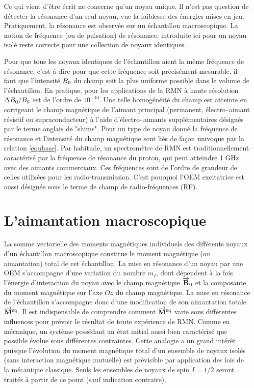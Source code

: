 Ce qui vient d'être écrit ne concerne qu'un noyau unique.
Il n'est pas question de détecter la résonance d'un seul noyau,
vue la faiblesse des énergies mises en jeu.
Pratiquement, la résonance est observée sur un échantillon macroscopique.
La notion de fréquence (ou de pulsation) de résonance,
introduite ici pour un noyau isolé reste correcte pour une
collection de noyaux identiques.

Pour que tous les noyaux identiques de l'échantillon aient la même fréquence de
résonance, c'est-à-dire pour que cette fréquence soit précisément mesurable, il faut
que l'intensité $B_0$ du champ soit la plus uniforme possible dans le
volume de l'échantillon.
En pratique, pour les applications de la RMN à haute résolution
$\Delta B_0/B_0$ est de l'ordre de $10^{-10}$.
Une telle homogénéité du champ est atteinte en corrigeant le champ magnétique
de l'aimant principal (permanent, électro--aimant résistif ou supraconducteur)
à l'aide d'électro--aimants supplémentaires désignés par le terme
anglais de "shims".
Pour un type de noyau donné la fréquence de résonance et l'intensité du champ
magnétique sont liés de façon univoque par la relation \ref{equbase}.
Par habitude, un spectromètre de RMN est traditionnellement
caractérisé par la fréquence de résonance du proton,
qui peut atteindre 1 GHz avec des aimants commerciaux.
Ces fréquences sont de l'ordre de grandeur de celles utilisées
pour les radio-transmission.
C'est pourquoi l'OEM excitatrice est aussi désignée sous le terme
de champ de radio-fréquences (RF).

\section{L'aimantation macroscopique}
\label{sec:macro}
La somme vectorielle des moments magnétiques individuels des différents
noyaux d'un échantillon macroscopique constitue le moment magnétique (ou
aimantation) total de cet échantillon.
La mise en résonance d'un noyau par une OEM
s'accompagne d'une variation du nombre $m_I$, dont dépendent à la fois
l'énergie d'interaction du noyau avec le champ magnétique $\overrightarrow{\mathbf{B}}_0$
et la composante du moment magnétique sur l'axe $Oz$ du champ magnétique.
La mise en résonance de l'échantillon s'accompagne
donc d'une modification de son aimantation totale $\overrightarrow{\mathbf{M}}^{\mbox{\footnotesize{eq}}}$.
Il est indispensable de comprendre comment $\overrightarrow{\mathbf{M}}^{\mbox{\footnotesize{eq}}}$
varie sous différentes influences pour prévoir le résultat de
toute expérience de RMN.
Comme en mécanique, un système possédant un état initial
aussi bien caractérisé que possible évolue sous différentes contraintes.
Cette analogie a un grand intérêt puisque l'évolution du moment magnétique total d'un
ensemble de noyaux isolés (sans interaction magnétique mutuelle) est prévisible par
application des lois de la mécanique classique.
Seuls les ensembles de noyaux de spin $I = 1/2$ seront
traités à partir de ce point (sauf indication contraire).

